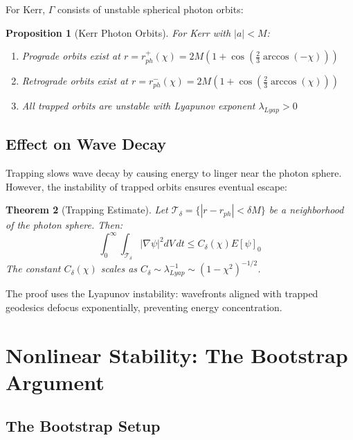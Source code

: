\documentclass[12pt,a4paper]{article}
\newtheorem{theorem}{Theorem}[section]
\newtheorem{proposition}[theorem]{Proposition}
\begin{document}
For Kerr, $\Gamma$ consists of unstable spherical photon orbits:

\begin{proposition}[Kerr Photon Orbits]
For Kerr with $|a| < M$:
\begin{enumerate}[label=(\roman*)]
    \item Prograde orbits exist at $r = r_{ph}^+(\chi) = 2M(1 + \cos(\frac{2}{3}\arccos(-\chi)))$
    \item Retrograde orbits exist at $r = r_{ph}^-(\chi) = 2M(1 + \cos(\frac{2}{3}\arccos(\chi)))$
    \item All trapped orbits are unstable with Lyapunov exponent $\lambda_{Lyap} > 0$
\end{enumerate}
\end{proposition}

\subsection{Effect on Wave Decay}

Trapping slows wave decay by causing energy to linger near the photon sphere. However, the instability of trapped orbits ensures eventual escape:

\begin{theorem}[Trapping Estimate]\label{thm:trapping}
Let $\mathcal{T}_\delta = \{|r - r_{ph}| < \delta M\}$ be a neighborhood of the photon sphere. Then:
\begin{equation}
\int_0^\infty \int_{\mathcal{T}_\delta} |\nabla \psi|^2 dV\, dt \leq C_\delta(\chi) E[\psi]_0
\end{equation}
The constant $C_\delta(\chi)$ scales as $C_\delta \sim \lambda_{Lyap}^{-1} \sim (1-\chi^2)^{-1/2}$.
\end{theorem}

The proof uses the Lyapunov instability: wavefronts aligned with trapped geodesics defocus exponentially, preventing energy concentration.

\section{Nonlinear Stability: The Bootstrap Argument}

\subsection{The Bootstrap Setup}
\end{document}
